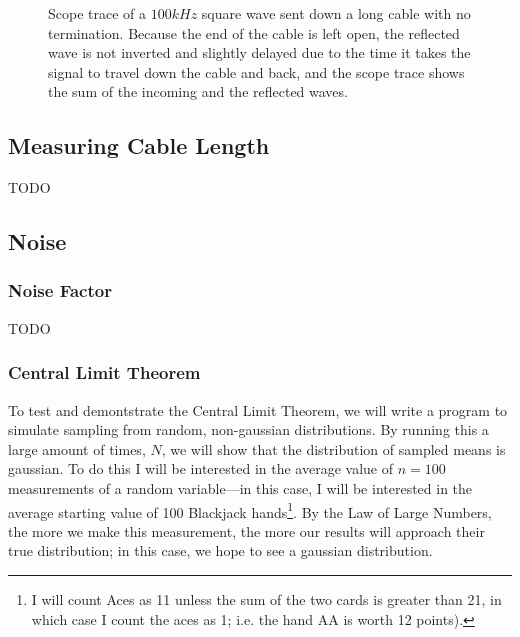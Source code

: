 \documentclass[12pt]{article}
\begin{document}
\begin{figure}[H]
\caption[SODUMB]{Scope trace of a $100kHz$ square wave sent down a long cable with no termination. Because the end of the cable is left open, the reflected wave is not inverted and slightly delayed due to the time it takes the signal to travel down the cable and back, and the scope trace shows the sum of the incoming and the reflected waves.}
\label{fig:reflections}
\end{figure}

\subsection*{Measuring Cable Length}
TODO

\subsection*{Noise}
\subsubsection*{Noise Factor}
TODO
\subsubsection*{Central Limit Theorem}
To test and demontstrate the Central Limit Theorem, we will write a program to simulate sampling from random, non-gaussian distributions. By running this a large amount of times, $N$, we will show that the distribution of sampled means is gaussian. To do this I will be interested in the average value of $n=100$ measurements of a random variable---in this case, I will be interested in the average starting value of 100 Blackjack hands\footnote{I will count Aces as 11 unless the sum of the two cards is greater than 21, in which case I count the aces as 1; i.e. the hand AA is worth 12 points).}. By the Law of Large Numbers, the more we make this measurement, the more our results will approach their true distribution; in this case, we hope to see a gaussian distribution.
\end{document}
